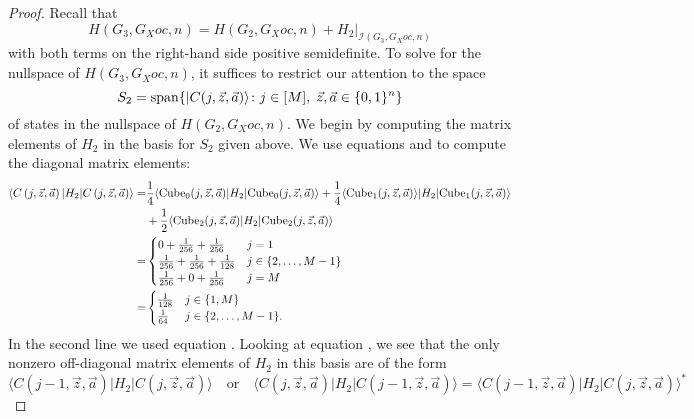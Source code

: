 \documentclass[../thesis-main/thesis-main]{subfiles}
\begin{document}
\begin{proof}
Recall that
\begin{equation}
H(G_{3},G_Xoc,n)=H(G_{2},G_Xoc,n)+H_{2}|_{\mathcal{I}(G_{3},G_Xoc,n)}
\end{equation}
with both terms on the right-hand side positive semidefinite. To solve for the nullspace of $H(G_{3},G_Xoc,n)$, it suffices to restrict our attention to the space
\begin{equation}
  S_{2}=\operatorname{span}\{ |C(j,\vec{z},\vec{a})\rangle\colon
    j\in[M],\;\vec{z},\vec{a}\in\{0,1\}^{n}\}
  \label{eq:S_beta_basis}
\end{equation}
of states in the nullspace of $H(G_{2},G_Xoc,n)$. We begin by computing the matrix elements of $H_{2}$ in the basis for $S_{2}$ given above. We use equations  and  to compute the diagonal matrix elements: 
\begin{align}
\langle C\left(j,\vec{z},\vec{a}\right)|H_{2}|C\left(j,\vec{z},\vec{a}\right)\rangle= & \frac{1}{4}\langle{\operatorname{Cube}_{0}(j,\vec{z},\vec{a})}|H_{2}|{\operatorname{Cube}_{0}(j,\vec{z},\vec{a})}\rangle+\frac{1}{4}\langle{\operatorname{Cube}_{1}(j,\vec{z},\vec{a})}\rangle|H_{2}|{\operatorname{Cube}_{1}(j,\vec{z},\vec{a})}\rangle\\
 & +\frac{1}{2}\langle{\operatorname{Cube}_{2}(j,\vec{z},\vec{a})}|H_{2}|{\operatorname{Cube}_{2}(j,\vec{z},\vec{a})}\rangle\\
= & \begin{cases}
0+\frac{1}{256}+\frac{1}{256} & j=1\\
\frac{1}{256}+\frac{1}{256}+\frac{1}{128} & j\in\{2,\ldots,M-1\}\\
\frac{1}{256}+0+\frac{1}{256} & j=M
\end{cases}\\
= & \begin{cases}
\frac{1}{128} & j\in\{1,M\} \\
\frac{1}{64} & j\in\{2,\ldots,M-1\}.
\end{cases}\label{eq:diag_C_mat_els}
\end{align}
In the second line we used equation . Looking at equation , we see that the only nonzero off-diagonal matrix elements of $H_{2}$ in this basis are of the form 
\begin{equation}
\langle C(j-1,\vec{z},\vec{a})|H_{2}|C(j,\vec{z},\vec{a})\rangle\quad
\text{or}\quad\langle C(j,\vec{z},\vec{a})|H_{2}|C(j-1,\vec{z},\vec{a})\rangle
=\langle C(j-1,\vec{z},\vec{a})|H_{2}|C(j,\vec{z},\vec{a})\rangle^{*}
\end{equation}

\end{proof}
\end{document}
